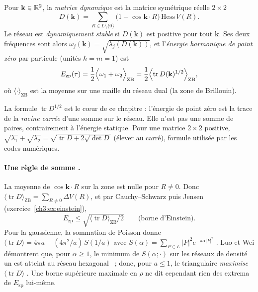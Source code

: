 \begin{definition}\label{ch3:def:ezp}
Pour $\mathbf k\in\mathbb{R}^2$, la \emph{matrice dynamique} est la matrice symétrique réelle $2\times2$
\[
D(\mathbf k)=\sum_{R\in L\setminus\{0\}}\bigl(1-\cos\mathbf k\cdot R\bigr)\,\mathrm{Hess}\,V(R).
\]
Le réseau est \emph{dynamiquement stable} si $D(\mathbf k)$ est positive pour tout $\mathbf k$. Ses deux fréquences sont
alors $\omega_j(\mathbf k)=\sqrt{\lambda_j(D(\mathbf k))}$, et l'\emph{énergie harmonique de point zéro} par particule
(unités $\hbar=m=1$) est
\[
E_{\mathrm{zp}}(\tau)=\frac12\Bigl\langle\omega_1+\omega_2\Bigr\rangle_{\mathrm{ZB}}=\frac12\Bigl\langle
\operatorname{tr}D(\mathbf k)^{1/2}\Bigr\rangle_{\mathrm{ZB}},
\]
où $\langle\cdot\rangle_{\mathrm{ZB}}$ est la moyenne sur une maille du réseau dual (la zone de Brillouin). \tierC
\end{definition}
\noindent La formule $\operatorname{tr}D^{1/2}$ est le cœur de ce chapitre : l'énergie de point zéro est la trace de la
\emph{racine carrée} d'une somme sur le réseau. Elle n'est pas une somme de paires, contrairement à l'énergie statique.
Pour une matrice $2\times2$ positive, $\sqrt{\lambda_1}+\sqrt{\lambda_2}=\sqrt{\operatorname{tr}D+2\sqrt{\det D}}$
(élever au carré), formule utilisée par les codes numériques.

\paragraph{Une règle de somme \tierC.} La moyenne de $\cos\mathbf k\cdot R$ sur la zone est nulle pour $R\neq0$. Donc
$\langle\operatorname{tr}D\rangle_{\mathrm{ZB}}=\sum_{R\ne0}\Delta V(R)$, et par Cauchy--Schwarz puis Jensen
(exercice~\ref{ch3:ex:einstein}),
\begin{equation}\label{ch3:eq:einstein}
E_{\mathrm{zp}}\le\sqrt{\langle\operatorname{tr}D\rangle_{\mathrm{ZB}}/2}\qquad\text{(borne d'Einstein).}
\end{equation}
Pour la gaussienne, la sommation de Poisson donne
$\langle\operatorname{tr}D\rangle=4\pi a-(4\pi^2/a)\,S(1/a)$ avec $S(\alpha)=\sum_{P\in L}|P|^2e^{-\pi\alpha|P|^2}$ \tierC.
Luo et Wei démontrent que, pour $\alpha\ge1$, le minimum de $S(\alpha;\cdot)$ sur les réseaux de densité un est atteint
au réseau hexagonal~\cite{ch3-luowei} \tierL ; donc, pour $a\le1$, le triangulaire \emph{maximise}
$\langle\operatorname{tr}D\rangle$ \tierC. Une borne supérieure maximale en $\rho$ ne dit cependant rien des extrema de
$E_{\mathrm{zp}}$ lui-même.

